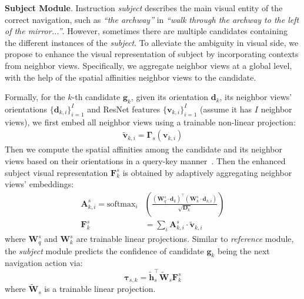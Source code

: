 \documentclass[sigconf]{acmart}
\begin{document}
\vspace{1mm}
\noindent\textbf{Subject Module}. Instruction \textit{subject} describes the main visual entity of the correct navigation, such as \textit{``the archway''} in \textit{``walk through the archway to the left of the mirror...''}. 
However, sometimes there are multiple candidates containing the different instances of the \textit{subject}.
To alleviate the ambiguity in visual side, we propose to enhance the visual representation of subject by incorporating contexts from neighbor views.
Specifically, we aggregate neighbor views at a global level, with the help of the spatial affinities neighbor views to the candidate.


Formally, for the $k$-th candidate $\mathbf{g}_k$, given its orientation $\mathbf{d}_k$, its neighbor views' orientations $\{\mathbf{d}_{k,i}\}_{i=1}^I$ and  ResNet features $\{\mathbf{v}_{k,i}\}_{i=1}^I$ (assume it has $I$ neighbor views), we first embed all neighbor views using a trainable non-linear projection:
\begin{align}
	\mathbf{\tilde{v}}_{k,i} = \mathbf{\Gamma}_s({\mathbf{v}}_{k,i})
\end{align}
Then we compute the spatial affinities among the candidate and its neighbor views based on their orientations in a query-key manner~\cite{ashish2017transformer}. Then the enhanced subject visual representation $\mathbf{F}_k^s$ is obtained by adaptively aggregating neighbor views' embeddings:
\begin{equation}
	\begin{aligned}\label{form_query}
		\mathbf{A}_{k,i}^s=\textrm{softmax}_i&(\frac{(\mathbf{W}_q^s\cdot \mathbf{d}_{k})^\top(\mathbf{W}_k^s\cdot \mathbf{d}_{k,i})}{\sqrt{\mathbf{D}_k}}) \\
		\mathbf{F}_k^s&=\sum_i \mathbf{A}_{k,i}^s\cdot \mathbf{\tilde{v}}_{k,i}
	\end{aligned}
\end{equation}
where $\mathbf{W}_q^s$ and $\mathbf{W}_k^s$ are trainable linear projections. 
Similar to \textit{reference} module, the \textit{subject} module predicts the confidence of candidate $\mathbf{g}_k$ being the next navigation action via: 
\begin{equation}
    \mathbf{\tau}_{s,k} = \mathbf{\tilde{h}}_s^\top \mathbf{\widetilde{W}}_s \mathbf{F}_k^s
\end{equation}
where $\mathbf{\widetilde{W}}_s$ is a trainable linear projection.
\end{document}
